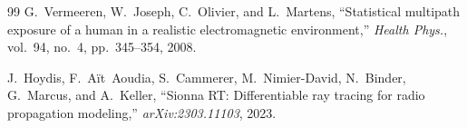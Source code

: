\documentclass[11pt,a4paper]{article}
\theoremstyle{definition}      %
\begin{document}
\begin{thebibliography}{99}
  G.~Vermeeren, W.~Joseph, C.~Olivier, and L.~Martens, ``Statistical multipath
  exposure of a human in a realistic electromagnetic environment,''
  \textit{Health Phys.}, vol.~94, no.~4, pp.~345--354, 2008.

  J.~Hoydis, F.~A\"{i}t~Aoudia, S.~Cammerer, M.~Nimier-David, N.~Binder,
  G.~Marcus, and A.~Keller, ``{Sionna RT}: Differentiable ray tracing for
  radio propagation modeling,'' \textit{arXiv:2303.11103}, 2023.

\end{thebibliography}
\endgroup
\end{document}

